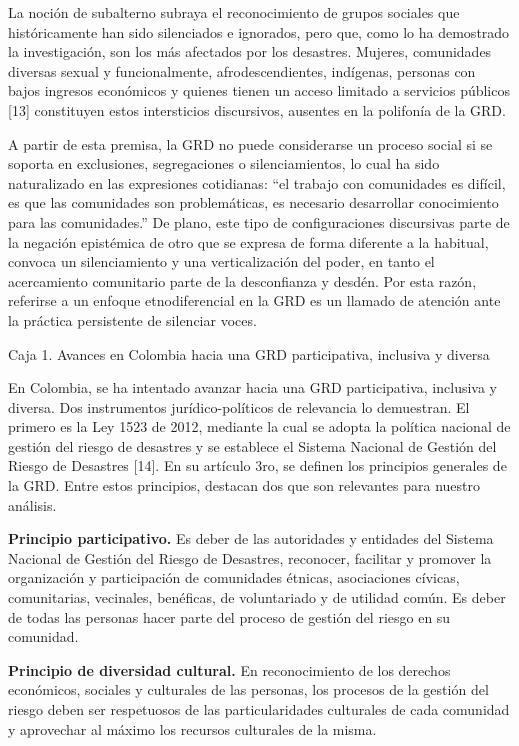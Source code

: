 \documentclass[
  spanish,
  letterpaper,
]{book}
\begin{document}
La noción de subalterno subraya el reconocimiento de grupos sociales que
históricamente han sido silenciados e ignorados, pero que, como lo ha
demostrado la investigación, son los más afectados por los desastres.
Mujeres, comunidades diversas sexual y funcionalmente,
afrodescendientes, indígenas, personas con bajos ingresos económicos y
quienes tienen un acceso limitado a servicios públicos {[}13{]}
constituyen estos intersticios discursivos, ausentes en la polifonía de
la GRD.

A partir de esta premisa, la GRD no puede considerarse un proceso social
si se soporta en exclusiones, segregaciones o silenciamientos, lo cual
ha sido naturalizado en las expresiones cotidianas: ``el trabajo con
comunidades es difícil, es que las comunidades son problemáticas, es
necesario desarrollar conocimiento para las comunidades.'' De plano,
este tipo de configuraciones discursivas parte de la negación epistémica
de otro que se expresa de forma diferente a la habitual, convoca un
silenciamiento y una verticalización del poder, en tanto el acercamiento
comunitario parte de la desconfianza y desdén. Por esta razón, referirse
a un enfoque etnodiferencial en la GRD es un llamado de atención ante la
práctica persistente de silenciar voces.

\begin{tcolorbox}[enhanced jigsaw, rightrule=.15mm, colframe=quarto-callout-important-color-frame, opacityback=0, arc=.35mm, bottomrule=.15mm, toprule=.15mm, breakable, colback=white, leftrule=.75mm, left=2mm]

Caja 1. Avances en Colombia hacia una GRD participativa, inclusiva y
diversa

En Colombia, se ha intentado avanzar hacia una GRD participativa,
inclusiva y diversa. Dos instrumentos jurídico-políticos de relevancia
lo demuestran. El primero es la Ley 1523 de 2012, mediante la cual se
adopta la política nacional de gestión del riesgo de desastres y se
establece el Sistema Nacional de Gestión del Riesgo de Desastres
{[}14{]}. En su artículo 3ro, se definen los principios generales de la
GRD. Entre estos principios, destacan dos que son relevantes para
nuestro análisis.

\textbf{Principio participativo.} Es deber de las autoridades y
entidades del Sistema Nacional de Gestión del Riesgo de Desastres,
reconocer, facilitar y promover la organización y participación de
comunidades étnicas, asociaciones cívicas, comunitarias, vecinales,
benéficas, de voluntariado y de utilidad común. Es deber de todas las
personas hacer parte del proceso de gestión del riesgo en su comunidad.

\textbf{Principio de diversidad cultural.} En reconocimiento de los
derechos económicos, sociales y culturales de las personas, los procesos
de la gestión del riesgo deben ser respetuosos de las particularidades
culturales de cada comunidad y aprovechar al máximo los recursos
culturales de la misma.

\end{tcolorbox}
\end{document}
